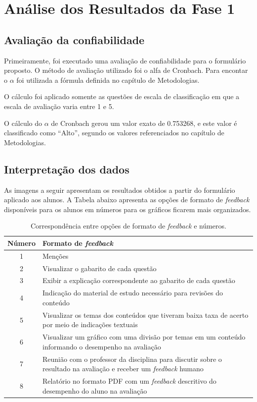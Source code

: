 \chapter{Análise dos Resultados da Fase 1}

\section{Avaliação da confiabilidade}

Primeiramente, foi executado uma avaliação de confiabilidade para o formulário proposto. O método de avaliação utilizado foi o alfa de Cronbach. Para encontar o $\alpha$ foi utilizada a fórmula definida no capítulo de Metodologias.

O cálculo foi aplicado somente as questões de escala de classificação em que a escala de avaliação varia entre 1 e 5.

O cálculo do $\alpha$ de Cronbach gerou um valor exato de 0.753268, e este valor é classificado como ``Alto'', segundo os valores referenciados no capítulo de Metodologias. 

\section{Interpretação dos dados}

As imagens a seguir apresentam os resultados obtidos a partir do formulário aplicado aos alunos. A Tabela abaixo apresenta as opções de formato de \textit{feedback} disponíveis para os alunos em números para os gráficos ficarem mais organizados.

\begin{table}[h!]
    \centering
    \begin{tabular}{|c|p{10cm}|}
        \hline
        \textbf{Número} & \textbf{Formato de \textit{feedback}} \\
        \hline
        1 & Menções \\
        \hline
        2 & Visualizar o gabarito de cada questão \\
        \hline
        3 & Exibir a explicação correspondente ao gabarito de cada questão \\
        \hline
        4 & Indicação do material de estudo necessário para revisões do conteúdo \\
        \hline
        5 & Visualizar os temas dos conteúdos que tiveram baixa taxa de acerto por meio de indicações textuais \\
        \hline
        6 & Visualizar um gráfico com uma divisão por temas em um conteúdo informando o desempenho na avaliação \\
        \hline
        7 & Reunião com o professor da disciplina para discutir sobre o resultado na avaliação e receber um \textit{feedback} humano \\
        \hline
        8 & Relatório no formato PDF com um \textit{feedback} descritivo do desempenho do aluno na avaliação \\
        \hline
    \end{tabular}
    \caption{Correspondência entre opções de formato de \textit{feedback} e números.}
    \label{tab:feedback_options}
\end{table}


